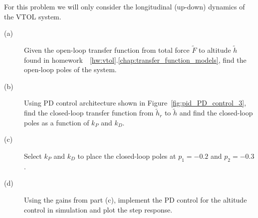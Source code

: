 For this problem we will only consider the longitudinal (up-down) dynamics of the VTOL system.  
\begin{description}
\item[(a)]
Given the open-loop transfer function from total force $\tilde{F}$ to altitude $\tilde{h}$ found in homework~~\ref{hw:vtol}.\ref{chap:transfer_function_models}, find the open-loop poles of the system.
\item[(b)]
Using PD control architecture shown in Figure~\ref{fig:pid_PD_control_3}, find the closed-loop transfer function from $\tilde{h}_r$ to $\tilde{h}$ and find the closed-loop poles as a function of $k_P$ and $k_D$.
\item[(c)]  Select $k_P$ and $k_D$ to place the closed-loop poles at $p_1=-0.2$ and $p_2=-0.3$.
\item[(d)] Using the gains from part (c), implement the PD control for the altitude control in simulation and plot the step response.
\end{description}
